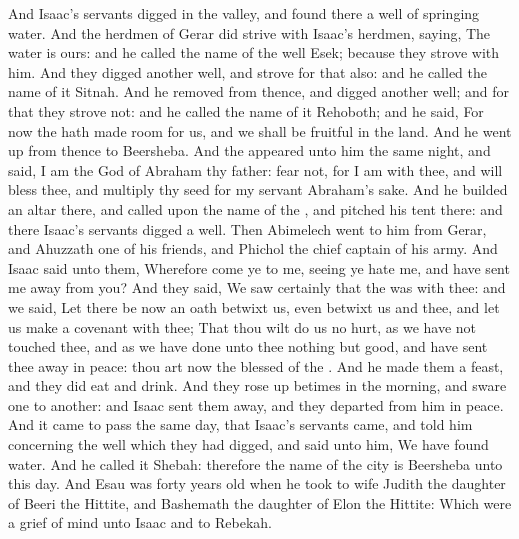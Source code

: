 \begin{biblechapter}
\verse And Isaac's servants digged in the valley, and found there a well of springing water.
\verse And the herdmen of Gerar did strive with Isaac's herdmen, saying, The water is ours: and he called the name of the well Esek; because they strove with him.
\verse And they digged another well, and strove for that also: and he called the name of it Sitnah.
\verse And he removed from thence, and digged another well; and for that they strove not: and he called the name of it Rehoboth; and he said, For now the \LORD hath made room for us, and we shall be fruitful in the land.
\verse And he went up from thence to Beersheba.
\verse And the \LORD appeared unto him the same night, and said, I am the God of Abraham thy father: fear not, for I am with thee, and will bless thee, and multiply thy seed for my servant Abraham's sake.
\verse And he builded an altar there, and called upon the name of the \LORD, and pitched his tent there: and there Isaac's servants digged a well.
\verse Then Abimelech went to him from Gerar, and Ahuzzath one of his friends, and Phichol the chief captain of his army.
\verse And Isaac said unto them, Wherefore come ye to me, seeing ye hate me, and have sent me away from you?
\verse And they said, We saw certainly that the \LORD was with thee: and we said, Let there be now an oath betwixt us, even betwixt us and thee, and let us make a covenant with thee;
\verse That thou wilt do us no hurt, as we have not touched thee, and as we have done unto thee nothing but good, and have sent thee away in peace: thou art now the blessed of the \LORD.
\verse And he made them a feast, and they did eat and drink.
\verse And they rose up betimes in the morning, and sware one to another: and Isaac sent them away, and they departed from him in peace.
\verse And it came to pass the same day, that Isaac's servants came, and told him concerning the well which they had digged, and said unto him, We have found water.
\verse And he called it Shebah: therefore the name of the city is Beersheba unto this day.
 And Esau was forty years old when he took to wife Judith the daughter of Beeri the Hittite, and Bashemath the daughter of Elon the Hittite:
\verse Which were a grief of mind unto Isaac and to Rebekah.
\end{biblechapter}

